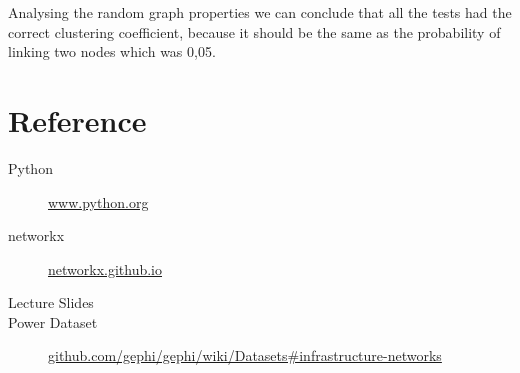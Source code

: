 \documentclass[a4paper,titlepage,11pt]{article}
\begin{document}
Analysing the random graph properties we can conclude that all the tests had the correct clustering coefficient, because it should be the same as the probability of linking two nodes which was 0,05.


\section{Reference}
\begin{description}
  \item[Python] \href{https://www.python.org}{www.python.org}
  \item[networkx] \href{https://networkx.github.io}{networkx.github.io}
  \item[Lecture Slides]
  \item[Power Dataset] \href{https://github.com/gephi/gephi/wiki/Datasets#infrastructure-networks}{github.com/gephi/gephi/wiki/Datasets#infrastructure-networks}
\end{description}
\end{document}
